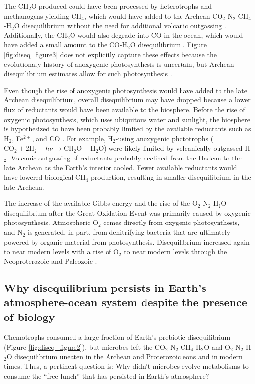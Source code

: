 The CH$_2$O produced could have been processed by heterotrophs and methanogens yielding CH$_4$, which would have added to the Archean CO$_2$-N$_2$-CH$_4$-H$_2$O disequilibrium without the need for additional volcanic outgassing \citep{KrissansenTotton_2018c}. Additionally, the CH$_2$O would also degrade into CO in the ocean, which would have added a small amount to the CO-H$_2$O disequilibrium \citep{Schwieterman_2019}. Figure \ref{fig:diseq_figure3} does not explicitly capture these effects because the evolutionary history of anoxygenic photosynthesis is uncertain, but Archean disequilibrium estimates allow for such photosynthesis \citep{KrissansenTotton_2018c}.

Even though the rise of anoxygenic photosynthesis would have added to the late Archean disequilibrium, overall disequilibrium may have dropped because a lower flux of reductants would have been available to the biosphere. Before the rise of oxygenic photosynthesis, which uses ubiquitous water and sunlight, the biosphere is hypothesized to have been probably limited by the available reductants such as H$_2$, Fe$^{2+}$, and CO \citep{Canfield_2006}. For example, H$_2$-using anoxygenic phototrophs ($\mathrm{CO_2} + 2 \mathrm{H_2} + h\nu \rightarrow \mathrm{CH_2O} + \mathrm{H_2O}$) were likely limited by volcanically outgassed H$_2$. Volcanic outgassing of reductants probably declined from the Hadean to the late Archean as the Earth's interior cooled. Fewer available reductants would have lowered biological CH$_4$ production, resulting in smaller disequilibrium in the late Archean.

The increase of the available Gibbs energy and the rise of the O$_2$-N$_2$-H$_2$O disequilibrium after the Great Oxidation Event was primarily caused by oxygenic photosynthesis. Atmospheric O$_2$ comes directly from oxygenic photosynthesis, and N$_2$ is generated, in part, from denitrifying bacteria that are ultimately powered by organic material from photosynthesis. Disequilibrium increased again to near modern levels with a rise of O$_2$ to near modern levels through the Neoproterozoic and Paleozoic \citep{Krause_2018}.

\subsection{Why disequilibrium persists in Earth's atmosphere-ocean system despite the presence of biology}

Chemotrophs consumed a large fraction of Earth's prebiotic disequilibrium (Figure \ref{fig:diseq_figure2}), but microbes left the CO$_2$-N$_2$-CH$_4$-H$_2$O and O$_2$-N$_2$-H$_2$O disequilibrium uneaten in the Archean and Proterozoic eons and in modern times. Thus, a pertinent question is: Why didn't microbes evolve metabolisms to consume the ``free lunch'' that has persisted in Earth's atmosphere?

